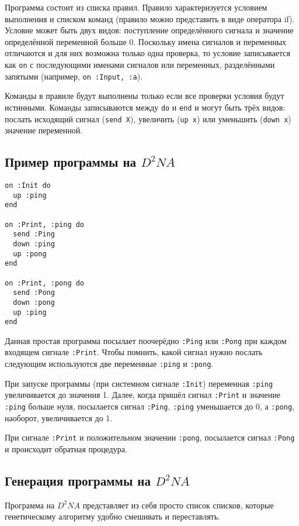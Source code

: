 \documentclass[utf8,a5paper,portrait,10pt]{eskdtext}
\begin{document}
Программа состоит из списка правил. Правило характеризуется условием выполнения
и списком команд (правило можно представить в виде оператора if). Условие может
быть двух видов: поступление определённого сигнала и значение определённой
переменной больше 0. Поскольку имена сигналов и переменных отличаются и для
них возможна только одна проверка, то условие записывается как \texttt{on} с
последующими именами сигналов или переменных, разделёнными запятыми (например,
\texttt{on~:Input, :a}).

Команды в правиле будут выполнены только если все проверки условия будут
истинными. Команды записываются между \texttt{do} и \texttt{end} и могут быть
трёх видов: послать исходящий сигнал (\texttt{send X}), увеличить
(\texttt{up~x}) или уменьшить (\texttt{down x}) значение переменной.

\subsection{Пример программы на $D^2NA$}
\begin{verbatim}
on :Init do
  up :ping
end

on :Print, :ping do
  send :Ping
  down :ping
  up :pong
end

on :Print, :pong do
  send :Pong
  down :pong
  up :ping
end
\end{verbatim}

Данная простая программа посылает поочерёдно \texttt{:Ping} или \texttt{:Pong}
при каждом входящем сигнале \texttt{:Print}. Чтобы помнить, какой сигнал нужно
послать следующим используются две переменные \texttt{:ping} и \texttt{:pong}.

При запуске программы (при системном сигнале \texttt{:Init}) переменная
\texttt{:ping} увеличивается до значения 1. Далее, когда пришёл сигнал
\texttt{:Print} и значение \texttt{:ping} больше нуля, посылается сигнал
\texttt{:Ping}, \texttt{:ping} уменьшается до 0, а \texttt{:pong}, наоборот,
увеличивается до 1.

При сигнале \texttt{:Print} и положительном значении \texttt{:pong}, посылается
сигнал \texttt{:Pong} и происходит обратная процедура.

\subsection{Генерация программы на $D^2NA$}
Программа на $D^2NA$ представляет из себя просто список списков, которые
генетическому алгоритму удобно смешивать и переставлять.
\end{document}
